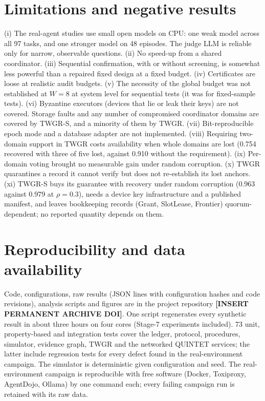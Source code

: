 \documentclass[pdflatex,sn-mathphys-num]{sn-jnl}
\theoremstyle{thmstyleone}
\theoremstyle{thmstyletwo}
\theoremstyle{thmstylethree}
\newcommand{\placeholder}[1]{\textbf{[#1]}}
\begin{document}
\section{Limitations and negative results}\label{sec:limits}
(i) The real-agent studies use small open models on CPU: one weak model across all 97 tasks, and one stronger model on 48 episodes. The judge LLM is reliable only for narrow, observable questions. (ii) No speed-up from a shared coordinator. (iii) Sequential confirmation, with or without screening, is somewhat less powerful than a repaired fixed design at a fixed budget. (iv) Certificates are loose at realistic audit budgets. (v) The necessity of the global budget was not established at $W=8$ at system level for sequential tests (it was for fixed-sample tests). (vi) Byzantine executors (devices that lie or leak their keys) are not covered. Storage faults and any number of compromised coordinator domains are covered by TWGR-S, and a minority of them by TWGR. (vii) Bit-reproducible epoch mode and a database adapter are not implemented. (viii) Requiring two-domain support in TWGR costs availability when whole domains are lost (0.754 recovered with three of five lost, against 0.910 without the requirement). (ix) Per-domain voting brought no measurable gain under random corruption. (x) TWGR quarantines a record it cannot verify but does not re-establish its lost anchors. (xi) TWGR-S buys its guarantee with recovery under random corruption (0.963 against 0.979 at $\rho=0.3$), needs a device key infrastructure and a published manifest, and leaves bookkeeping records (Grant, SlotLease, Frontier) quorum-dependent; no reported quantity depends on them.

\section{Reproducibility and data availability}\label{sec:repro}
Code, configurations, raw results (JSON lines with configuration hashes and code revisions), analysis scripts and figures are in the project repository \placeholder{INSERT PERMANENT ARCHIVE DOI}. One script regenerates every synthetic result in about three hours on four cores (Stage-7 experiments included). 73 unit, property-based and integration tests cover the ledger, protocol, procedures, simulator, evidence graph, TWGR and the networked QUINTET services; the latter include regression tests for every defect found in the real-environment campaign. The simulator is deterministic given configuration and seed. The real-environment campaign is reproducible with free software (Docker, Toxiproxy, AgentDojo, Ollama) by one command each; every failing campaign run is retained with its raw data.
\end{document}
